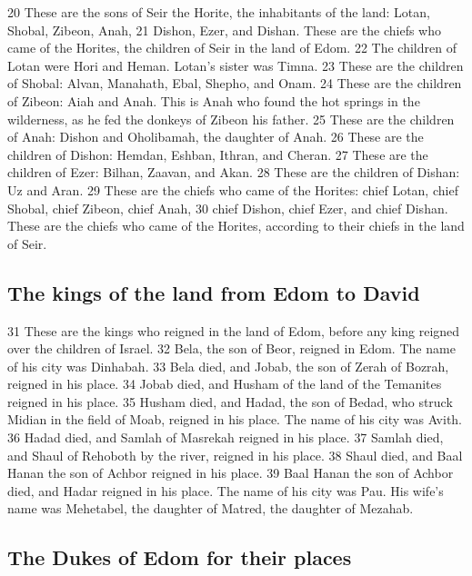 {20} These are the sons of Seir the Horite, the inhabitants of the land:
Lotan, Shobal, Zibeon, Anah, {21} Dishon, Ezer, and Dishan. These are
the chiefs who came of the Horites, the children of Seir in the land of
Edom. {22} The children of Lotan were Hori and Heman. Lotan's sister was
Timna. {23} These are the children of Shobal: Alvan, Manahath, Ebal,
Shepho, and Onam. {24} These are the children of Zibeon: Aiah and Anah.
This is Anah who found the hot springs in the wilderness, as he fed the
donkeys of Zibeon his father. {25} These are the children of Anah:
Dishon and Oholibamah, the daughter of Anah. {26} These are the children
of Dishon: Hemdan, Eshban, Ithran, and Cheran. {27} These are the
children of Ezer: Bilhan, Zaavan, and Akan. {28} These are the children
of Dishan: Uz and Aran. {29} These are the chiefs who came of the
Horites: chief Lotan, chief Shobal, chief Zibeon, chief Anah, {30} chief
Dishon, chief Ezer, and chief Dishan. These are the chiefs who came of
the Horites, according to their chiefs in the land of Seir.

\hypertarget{the-kings-of-the-land-from-edom-to-david}{%
\subsection{The kings of the land from Edom to
David}\label{the-kings-of-the-land-from-edom-to-david}}

{31} These are the kings who reigned in the land of Edom, before any
king reigned over the children of Israel. {32} Bela, the son of Beor,
reigned in Edom. The name of his city was Dinhabah. {33} Bela died, and
Jobab, the son of Zerah of Bozrah, reigned in his place. {34} Jobab
died, and Husham of the land of the Temanites reigned in his place. {35}
Husham died, and Hadad, the son of Bedad, who struck Midian in the field
of Moab, reigned in his place. The name of his city was Avith. {36}
Hadad died, and Samlah of Masrekah reigned in his place. {37} Samlah
died, and Shaul of Rehoboth by the river, reigned in his place. {38}
Shaul died, and Baal Hanan the son of Achbor reigned in his place. {39}
Baal Hanan the son of Achbor died, and Hadar reigned in his place. The
name of his city was Pau. His wife's name was Mehetabel, the daughter of
Matred, the daughter of Mezahab.

\hypertarget{the-dukes-of-edom-for-their-places}{%
\subsection{The Dukes of Edom for their
places}\label{the-dukes-of-edom-for-their-places}}

